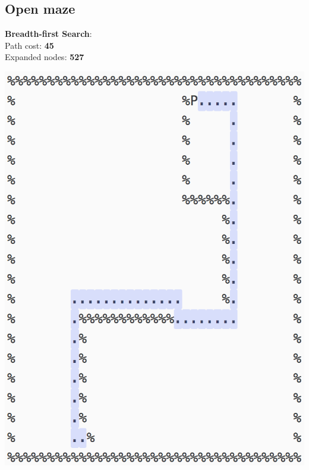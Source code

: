 \documentclass[11pt]{article}
\begin{document}
\subsection*{Open maze}
\textbf{Breadth-first Search}:\\
Path cost: \textbf{45}\\
Expanded nodes: \textbf{527}
\begin{center}
\includegraphics[scale=1]{open-maze/bfs.png}
\end{center}
\pagebreak
\end{document}
